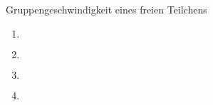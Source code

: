 \documentclass{alex_hü}
\begin{document}
\begin{mybox}{Gruppengeschwindigkeit eines freien Teilchens}
	\centering \(  \)
	\tcblower
	\begin{enumerate}
		\item \(  \)
	\tcbline
		\item \(  \)
	\tcbline
		\item \(  \)
	\tcbline
		\item 
%			
	\end{enumerate}
\end{mybox}
\end{document}

